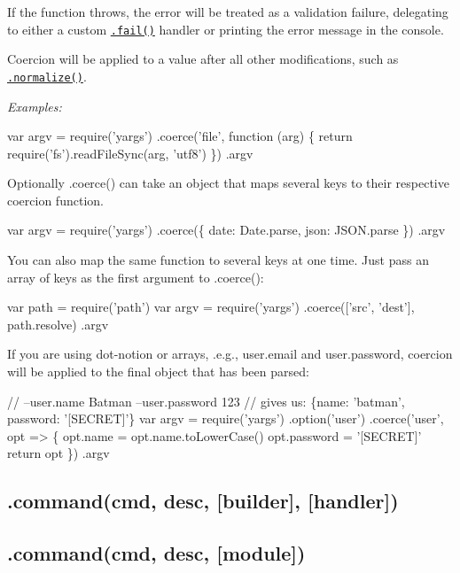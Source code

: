 If the function throws, the error will be treated as a validation failure, delegating to either a custom \href{#fail}{\tt {\ttfamily .fail()}} handler or printing the error message in the console.

Coercion will be applied to a value after all other modifications, such as \href{#normalize}{\tt {\ttfamily .normalize()}}.

{\itshape Examples\+:}


\begin{DoxyCode}
var argv = require('yargs')
  .coerce('file', function (arg) \{
    return require('fs').readFileSync(arg, 'utf8')
  \})
  .argv
\end{DoxyCode}


Optionally {\ttfamily .coerce()} can take an object that maps several keys to their respective coercion function.


\begin{DoxyCode}
var argv = require('yargs')
  .coerce(\{
    date: Date.parse,
    json: JSON.parse
  \})
  .argv
\end{DoxyCode}


You can also map the same function to several keys at one time. Just pass an array of keys as the first argument to {\ttfamily .coerce()}\+:


\begin{DoxyCode}
var path = require('path')
var argv = require('yargs')
  .coerce(['src', 'dest'], path.resolve)
  .argv
\end{DoxyCode}


If you are using dot-\/notion or arrays, .e.\+g., {\ttfamily user.\+email} and {\ttfamily user.\+password}, coercion will be applied to the final object that has been parsed\+:


\begin{DoxyCode}
// --user.name Batman --user.password 123
// gives us: \{name: 'batman', password: '[SECRET]'\}
var argv = require('yargs')
  .option('user')
  .coerce('user', opt => \{
    opt.name = opt.name.toLowerCase()
    opt.password = '[SECRET]'
    return opt
  \})
  .argv
\end{DoxyCode}


\subsection*{.command(cmd, desc, \mbox{[}builder\mbox{]}, \mbox{[}handler\mbox{]}) }

\subsection*{.command(cmd, desc, \mbox{[}module\mbox{]}) }

